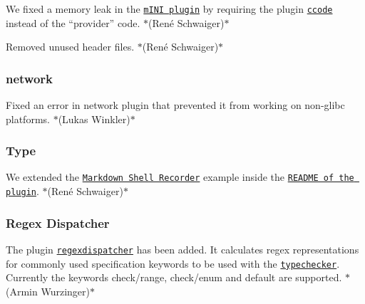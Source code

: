 \begin{DoxyItemize}
\item We fixed a memory leak in the \href{https://libelektra.org/plugins/mini}{\tt m\+I\+NI plugin} by requiring the plugin \href{https://libelektra.org/plugins/ccode}{\tt {\ttfamily ccode}} instead of the “provider” {\ttfamily code}. $\ast$(René Schwaiger)$\ast$
\item Removed unused header files. $\ast$(René Schwaiger)$\ast$
\end{DoxyItemize}

\subsubsection*{network}


\begin{DoxyItemize}
\item Fixed an error in network plugin that prevented it from working on non-\/glibc platforms. $\ast$(Lukas Winkler)$\ast$
\end{DoxyItemize}

\subsubsection*{Type}


\begin{DoxyItemize}
\item We extended the \href{https://master.libelektra.org/tests/shell/shell_recorder/tutorial_wrapper}{\tt Markdown Shell Recorder} example inside the \href{https://www.libelektra.org/plugins/type}{\tt R\+E\+A\+D\+ME of the plugin}. $\ast$(René Schwaiger)$\ast$
\end{DoxyItemize}

\subsubsection*{Regex Dispatcher}


\begin{DoxyItemize}
\item The plugin \href{https://www.libelektra.org/plugins/regexdispatcher}{\tt regexdispatcher} has been added. It calculates regex representations for commonly used specification keywords to be used with the \href{https://www.libelektra.org/plugins/typechecker}{\tt typechecker}. Currently the keywords {\ttfamily check/range}, {\ttfamily check/enum} and {\ttfamily default} are supported. $\ast$(Armin Wurzinger)$\ast$
\end{DoxyItemize}

